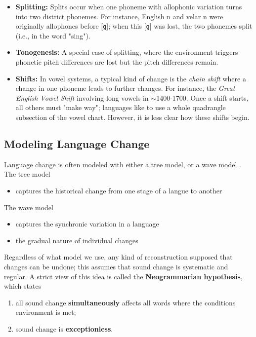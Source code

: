 \documentclass[12pt]{article}
\begin{document}
\begin{itemize}
  \item \textbf{Splitting:} Splits occur when one phoneme with allophonic variation turns into two district phonemes. For instance, English n and velar n were originally allophones before [\texttt{g}]; when this [\texttt{g}] was lost, the two phonemes split (i.e., in the word "sing").
  \item \textbf{Tonogenesis:} A special case of splitting, where the environment triggers phonetic pitch differences are lost but the pitch differences remain.
  \item \textbf{Shifts:} In vowel systems, a typical kind of change is the \textit{chain shift} where a change in one phoneme leads to further changes. For instance, the \textit{Great English Vowel Shift} involving long vowels in $\sim$1400-1700. Once a shift starts, all others must "make way"; languages like to use a whole quadrangle subsection of the vowel chart. However, it is less clear how these shifts begin.
\end{itemize}


\subsection{Modeling Language Change}

Language change is often modeled with either a tree model, or a wave model . The tree model \begin{itemize}
  \item captures the historical change from one stage of a langue to another
\end{itemize}
The wave model \begin{itemize}
  \item captures the synchronic variation in a language
  \item the gradual nature of individual changes
\end{itemize}

Regardless of what model we use, any kind of reconstruction supposed that changes can be undone; this assumes that sound change is systematic and regular. A strict view of this idea is called the \textbf{Neogrammarian hypothesis}, which states \begin{enumerate}
  \item all sound change \textbf{simultaneously} affects all words where the conditions environment is met;
  \item sound change is \textbf{exceptionless}.
\end{enumerate}
\end{document}

